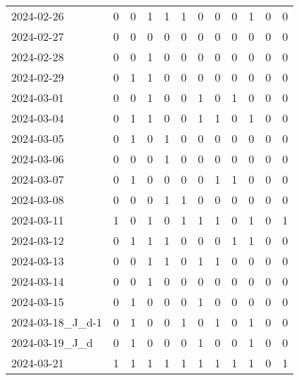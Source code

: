 \documentclass[dvipdfmx,oneside]{article}
\begin{document}
\begin{tabular}{lccccccccccc}
        2024-02-26 &     0 &     0 &     1 &     1 &     1 &     0 &     0 &     0 &     1 &     0 &     0 \\
        2024-02-27 &     0 &     0 &     0 &     0 &     0 &     0 &     0 &     0 &     0 &     0 &     0 \\
        2024-02-28 &     0 &     0 &     1 &     0 &     0 &     0 &     0 &     0 &     0 &     0 &     0 \\
        2024-02-29 &     0 &     1 &     1 &     0 &     0 &     0 &     0 &     0 &     0 &     0 &     0 \\
        2024-03-01 &     0 &     0 &     1 &     0 &     0 &     1 &     0 &     1 &     0 &     0 &     0 \\
        2024-03-04 &     0 &     1 &     1 &     0 &     0 &     1 &     1 &     0 &     1 &     0 &     0 \\
        2024-03-05 &     0 &     1 &     0 &     1 &     0 &     0 &     0 &     0 &     0 &     0 &     0 \\
        2024-03-06 &     0 &     0 &     0 &     1 &     0 &     0 &     0 &     0 &     0 &     0 &     0 \\
        2024-03-07 &     0 &     1 &     0 &     0 &     0 &     0 &     1 &     1 &     0 &     0 &     0 \\
        2024-03-08 &     0 &     0 &     0 &     1 &     1 &     0 &     0 &     0 &     0 &     0 &     0 \\
        2024-03-11 &     1 &     0 &     1 &     0 &     1 &     1 &     1 &     0 &     1 &     0 &     1 \\
        2024-03-12 &     0 &     1 &     1 &     1 &     0 &     0 &     0 &     1 &     1 &     0 &     0 \\
        2024-03-13 &     0 &     0 &     1 &     1 &     0 &     1 &     1 &     0 &     0 &     0 &     0 \\
        2024-03-14 &     0 &     0 &     1 &     0 &     0 &     0 &     0 &     0 &     0 &     0 &     0 \\
        2024-03-15 &     0 &     1 &     0 &     0 &     0 &     1 &     0 &     0 &     0 &     0 &     0 \\
2024-03-18\_J\_d-1 &     0 &     1 &     0 &     0 &     1 &     0 &     1 &     0 &     1 &     0 &     0 \\
  2024-03-19\_J\_d &     0 &     1 &     0 &     0 &     0 &     1 &     0 &     0 &     1 &     0 &     0 \\
        2024-03-21 &     1 &     1 &     1 &     1 &     1 &     1 &     1 &     1 &     1 &     0 &     1 \\

\end{tabular}
\end{document}
